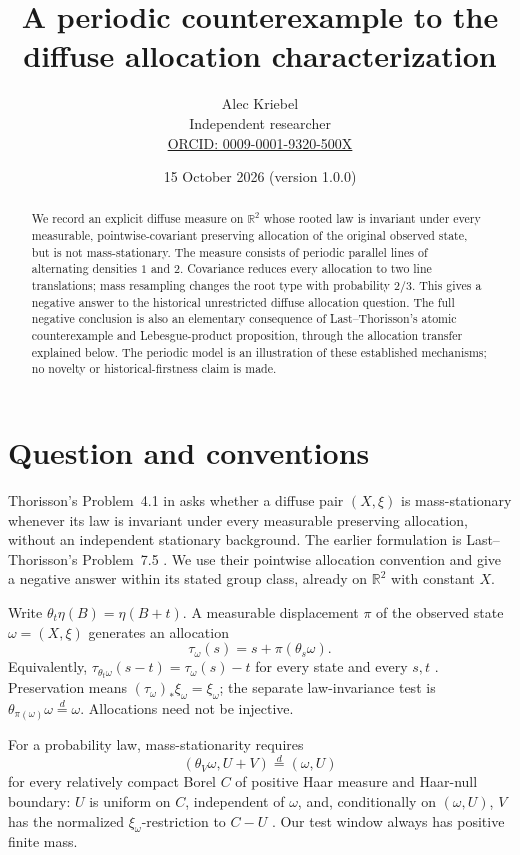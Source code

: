 \documentclass[11pt]{article}
\title{A periodic counterexample to the diffuse allocation characterization}
\author{Alec Kriebel\\\small Independent researcher\\
\small\href{https://orcid.org/0009-0001-9320-500X}{ORCID: 0009-0001-9320-500X}}
\date{15 October 2026 \quad (version 1.0.0)}
\newcommand{\R}{\mathbb R}
\begin{document}
\maketitle

\begin{abstract}
We record an explicit diffuse measure on $\R^2$ whose rooted law is invariant under every measurable, pointwise-covariant preserving allocation of the original observed state, but is not mass-stationary. The measure consists of periodic parallel lines of alternating densities $1$ and $2$. Covariance reduces every allocation to two line translations; mass resampling changes the root type with probability $2/3$. This gives a negative answer to the historical unrestricted diffuse allocation question. The full negative conclusion is also an elementary consequence of Last--Thorisson's atomic counterexample and Lebesgue-product proposition, through the allocation transfer explained below. The periodic model is an illustration of these established mechanisms; no novelty or historical-firstness claim is made.
\end{abstract}

\section{Question and conventions}

Thorisson's Problem~4.1 in \cite[pp.~5--6]{Thorisson} asks whether a diffuse pair $(X,\xi)$ is mass-stationary whenever its law is invariant under every measurable preserving allocation, without an independent stationary background. The earlier formulation is Last--Thorisson's Problem~7.5 \cite{LT09}. We use their pointwise allocation convention and give a negative answer within its stated group class, already on $\R^2$ with constant $X$.

Write $\theta_t\eta(B)=\eta(B+t)$. A measurable displacement $\pi$ of the observed state $\omega=(X,\xi)$ generates an allocation
\begin{equation}\label{allocation}
 \tau_\omega(s)=s+\pi(\theta_s\omega).
\end{equation}
Equivalently, $\tau_{\theta_t\omega}(s-t)=\tau_\omega(s)-t$ for every state and every $s,t$ \cite[Example~3.4]{LT09}. Preservation means $(\tau_\omega)_*\xi_\omega=\xi_\omega$; the separate law-invariance test is $\theta_{\pi(\omega)}\omega\overset d=\omega$. Allocations need not be injective.

For a probability law, mass-stationarity requires
\begin{equation}\label{MS}
 (\theta_V\omega,U+V)\overset d=(\omega,U)
\end{equation}
for every relatively compact Borel $C$ of positive Haar measure and Haar-null boundary: $U$ is uniform on $C$, independent of $\omega$, and, conditionally on $(\omega,U)$, $V$ has the normalized $\xi_\omega$-restriction to $C-U$ \cite[Definition~6.1 and Remark~6.2]{LT09}. Our test window always has positive finite mass.
\end{document}
